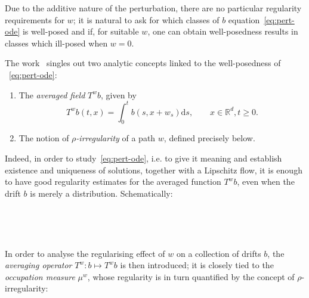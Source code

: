 \documentclass[10pt]{article}
\newcommand{\mathd}{\mathrm{d}}
\newcommand{\tmtextit}[1]{{\itshape{#1}}}
\begin{document}
Due to the additive nature of the perturbation, there are no particular
regularity requirements for $w$; it is natural to ask for which classes of $b$
equation~{\eqref{eq:pert-ode}} is well-posed and if, for suitable $w$, one can
obtain well-posedness results in classes which ill-posed when $w = 0$.

The work~{\cite{catelliergubinelli}} singles out two analytic concepts linked
to the well-posedness of ~{\eqref{eq:pert-ode}}:
\begin{enumerate}
  \item The \tmtextit{averaged field} $T^w b$, given by
  \[ T^w b (t, x) = \int_0^t b (s, x + w_s) \mathd s, \qquad x \in
     \mathbb{R}^d, t \geqslant 0. \]
  \item The notion of \tmtextit{$\rho$-irregularity} of a path $w$, defined
  precisely below.
\end{enumerate}
Indeed, in order to study~{\eqref{eq:pert-ode}}, i.e. to give it meaning and
establish existence and uniqueness of solutions, together with a Lipschitz
flow, it is enough to have good regularity estimates for the averaged function
$T^w b$, even when the drift $b$ is merely a distribution. Schematically:

\

\begin{center}
\end{center}

\

In order to analyse the regularising effect of $w$ on a collection of drifts
$b$, the \tmtextit{averaging operator} $T^w : b \mapsto T^w b$ is then
introduced; it is closely tied to the \tmtextit{occupation measure} $\mu^w$,
whose regularity is in turn quantified by the concept of $\rho$-irregularity:

\

\begin{center}
\end{center}
\end{document}
